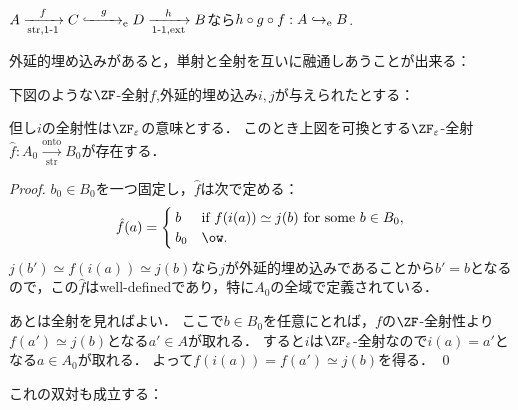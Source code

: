\documentclass[realisability.tex]{subfiles}
\begin{document}
\begin{lemma}\label{lem:compos-ext-emb}
 $A \xrightarrow[\mathrm{str}, \text{1-1}]{f} C \mathrel{\smash{\xhookrightarrow[\hphantom{\mathrm{str}, \text{1-1}}]{g}}_{\mathrm{e}}} D \xrightarrow[\text{1-1}, \mathrm{ext}]{h} B$なら$h \circ g \circ f: A \hookrightarrow_{\mathrm{e}} B$.
\end{lemma}
外延的埋め込みがあると，単射と全射を互いに融通しあうことが出来る：
\begin{lemma}
 下図のような$\ZF$-全射$f$,外延的埋め込み$i, j$が与えられたとする：
 \begin{center}
 \end{center}
 但し$i$の全射性は$\ZFe$の意味とする．
 このとき上図を可換とする$\ZFe$-全射$\hat{f}: A_0 \xrightarrow[\mathrm{str}]{\mathrm{onto}} B_0$が存在する．
\end{lemma}
\begin{proof}
 $b_0 \in B_0$を一つ固定し，$\hat{f}$は次で定める：
 \[
  \hat{f}(a) =
  \begin{cases}
   b   & \text{if } f(i(a)) \simeq j(b) \text{ for some } b \in B_0,\\
   b_0 & \ow.
  \end{cases}
 \]
 $j(b') \simeq f(i(a)) \simeq j(b)$なら$j$が外延的埋め込みであることから$b' = b$となるので，この$\hat{f}$はwell-definedであり，特に$A_0$の全域で定義されている．

 あとは全射を見ればよい．
 ここで$b \in B_0$を任意にとれば，$f$の$\ZF$-全射性より$f(a') \simeq j(b)$となる$a' \in A$が取れる．
 すると$i$は$\ZFe$-全射なので$i(a) = a'$となる$a \in A_0$が取れる．
 よって$f(i(a)) = f(a') \simeq j(b)$を得る． \qed
\end{proof}
これの双対も成立する：
\end{document}

